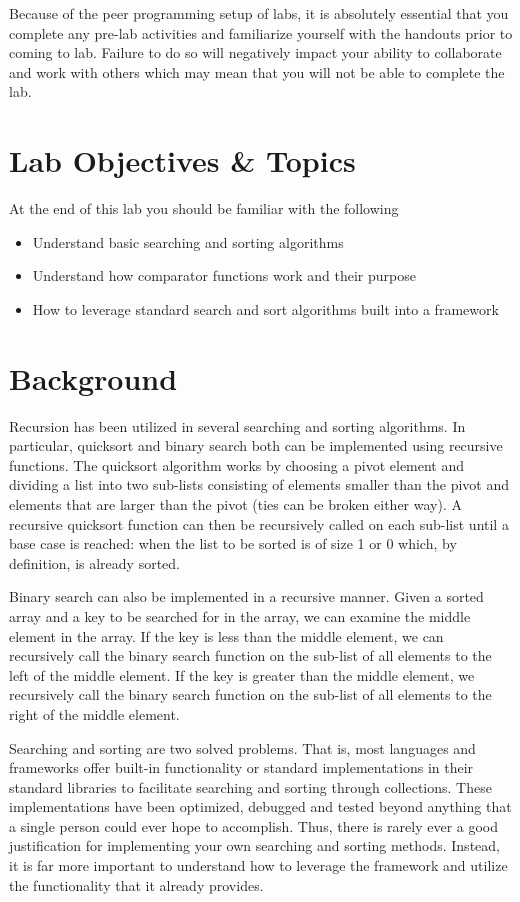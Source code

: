 \documentclass[12pt]{scrartcl}
\begin{document}
Because of the peer programming setup of labs, it is absolutely
essential that you complete any pre-lab activities and familiarize
yourself with the handouts prior to coming to lab.  Failure to do
so will negatively impact your ability to collaborate and work with
others which may mean that you will not be able to complete the
lab.

\section{Lab Objectives \& Topics}
At the end of this lab you should be familiar with the following
\begin{itemize}
  \item Understand basic searching and sorting algorithms
  \item Understand how comparator functions work and their purpose
  \item How to leverage standard search and sort algorithms built into a framework
\end{itemize}

\section{Background}

Recursion has been utilized in several searching and sorting
algorithms. In particular, quicksort and binary search both can
be implemented using recursive functions.  The quicksort
algorithm works by choosing a pivot element and dividing a
list into two sub-lists consisting of elements smaller than the
pivot and elements that are larger than the pivot (ties can be
broken either way).  A recursive quicksort function can then
be recursively called on each sub-list until a base case is
reached: when the list to be sorted is of size 1 or 0 which,
by definition, is already sorted.

Binary search can also be implemented in a recursive manner.
Given a sorted array and a key to be searched for in the array,
we can examine the middle element in the array.  If the key is
less than the middle element, we can recursively call the binary
search function on the sub-list of all elements to the left of the
middle element.  If the key is greater than the middle element,
we recursively call the binary search function on the sub-list of
all elements to the right of the middle element.

Searching and sorting are two solved problems.  That is, most
languages and frameworks offer built-in functionality or
standard implementations in their standard libraries to facilitate
searching and sorting through collections.  These implementations
have been optimized, debugged and tested beyond anything that
a single person could ever hope to accomplish.  Thus, there is
rarely ever a good justification for implementing your own
searching and sorting methods.  Instead, it is far more important
to understand how to leverage the framework and utilize the
functionality that it already provides.
\end{document}

